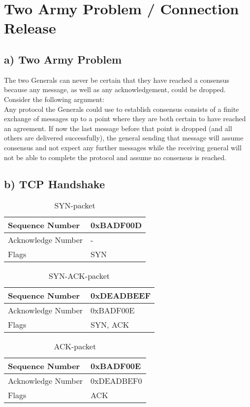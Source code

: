 \documentclass[a4paper, 11 pt, article, accentcolor=tud7b]{tudreport}
\begin{document}
	\section{Two Army Problem / Connection Release}
	
	\subsection*{a) Two Army Problem}
	
	The two Generals can never be certain that they have reached a consensus because any message, as well as any acknowledgement, could be dropped. Consider the following argument: \medskip \\
	Any protocol the Generals could use to establish consensus consists of a finite exchange of messages up to a point where they are both certain to have reached an agreement. If now the last message before that point is dropped (and all others are delivered successfully), the general sending that message will assume consensus and not expect any further messages while the receiving general will not be able to complete the protocol and assume no consensus is reached.
	
	\subsection*{b) TCP Handshake}
	
	  \begin{table}[h]
	    \centering
	    \begin{tabular}{| l | l |}
	      \hline
	      Sequence Number & 0xBADF00D \\ \hline
	      Acknowledge Number & - \\ \hline
	      Flags & SYN \\ \hline
	    \end{tabular}
	    \caption{SYN-packet}
	  \end{table}
	  
	  \begin{table}[h]
	    \centering
	    \begin{tabular}{| l | l |}
	      \hline
	      Sequence Number & 0xDEADBEEF \\ \hline
	      Acknowledge Number & 0xBADF00E \\ \hline
	      Flags & SYN, ACK \\ \hline
	    \end{tabular}
	    \caption{SYN-ACK-packet}
	  \end{table}
	
	  \begin{table}[h]
	    \centering
	    \begin{tabular}{| l | l |}
	      \hline
	      Sequence Number & 0xBADF00E \\ \hline
	      Acknowledge Number & 0xDEADBEF0 \\ \hline
	      Flags & ACK \\ \hline
	    \end{tabular}
	    \caption{ACK-packet}
	  \end{table}
	
	
\end{document}
